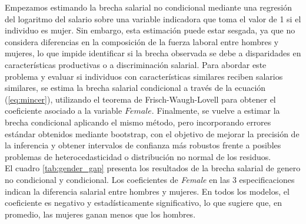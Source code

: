 \documentclass[12pt,a4paper,onecolumn]{article}
\begin{document}
Empezamos estimando la brecha salarial no condicional mediante una regresión del logaritmo del salario sobre una variable indicadora que toma el valor de 1 si el individuo es mujer. Sin embargo, esta estimación puede estar sesgada, ya que no considera diferencias en la composición de la fuerza laboral entre hombres y mujeres, lo que impide identificar si la brecha observada se debe a disparidades en características productivas o a discriminación salarial. Para abordar este problema y evaluar si individuos con características similares reciben salarios similares, se estima la brecha salarial condicional a través de la ecuación (\ref{eq:mincer}), utilizando el teorema de Frisch-Waugh-Lovell para obtener el coeficiente asociado a la variable $Female$. Finalmente, se vuelve a estimar la brecha condicional aplicando el mismo método, pero incorporando errores estándar obtenidos mediante bootstrap, con el objetivo de mejorar la precisión de la inferencia y obtener intervalos de confianza más robustos frente a posibles problemas de heterocedasticidad o distribución no normal de los residuos. \\

El cuadro \ref{tab:gender_gap} presenta los resultados de la brecha salarial de genero no condicional y condicional. Los coeficientes de \textit{Female} en las 3 especificaciones indican la diferencia salarial entre hombres y mujeres. En todos los modelos, el coeficiente es negativo y estadísticamente significativo, lo que sugiere que, en promedio, las mujeres ganan menos que los hombres. \\
\end{document}
